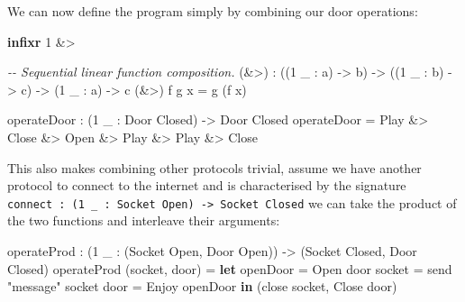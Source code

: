\documentclass[
]{article}
\newenvironment{Shaded}{}{}
\newcommand{\CommentTok}[1]{\textcolor[rgb]{0.38,0.63,0.69}{\textit{#1}}}
\newcommand{\DataTypeTok}[1]{\textcolor[rgb]{0.56,0.13,0.00}{#1}}
\newcommand{\DecValTok}[1]{\textcolor[rgb]{0.25,0.63,0.44}{#1}}
\newcommand{\KeywordTok}[1]{\textcolor[rgb]{0.00,0.44,0.13}{\textbf{#1}}}
\newcommand{\NormalTok}[1]{#1}
\newcommand{\OperatorTok}[1]{\textcolor[rgb]{0.40,0.40,0.40}{#1}}
\newcommand{\OtherTok}[1]{\textcolor[rgb]{0.00,0.44,0.13}{#1}}
\newcommand{\StringTok}[1]{\textcolor[rgb]{0.25,0.44,0.63}{#1}}
\begin{document}
We can now define the program simply by combining our door operations:

\begin{Shaded}
\begin{Highlighting}[]
\KeywordTok{infixr} \DecValTok{1} \OperatorTok{\&\textgreater{}}

\CommentTok{{-}{-} Sequential linear function composition.}
\NormalTok{(}\OperatorTok{\&\textgreater{}}\NormalTok{) }\OperatorTok{:}\NormalTok{ ((}\DecValTok{1}\NormalTok{ \_ }\OperatorTok{:}\NormalTok{ a) }\OtherTok{{-}\textgreater{}}\NormalTok{ b) }\OtherTok{{-}\textgreater{}} 
\NormalTok{       ((}\DecValTok{1}\NormalTok{ \_ }\OperatorTok{:}\NormalTok{ b) }\OtherTok{{-}\textgreater{}}\NormalTok{ c) }\OtherTok{{-}\textgreater{}} 
\NormalTok{        (}\DecValTok{1}\NormalTok{ \_ }\OperatorTok{:}\NormalTok{ a) }\OtherTok{{-}\textgreater{}}\NormalTok{ c}
\NormalTok{(}\OperatorTok{\&\textgreater{}}\NormalTok{) f g x }\OtherTok{=}\NormalTok{ g (f x)}

\NormalTok{operateDoor }\OperatorTok{:}\NormalTok{ (}\DecValTok{1}\NormalTok{ \_ }\OperatorTok{:} \DataTypeTok{Door} \DataTypeTok{Closed}\NormalTok{) }\OtherTok{{-}\textgreater{}} \DataTypeTok{Door} \DataTypeTok{Closed}
\NormalTok{operateDoor }\OtherTok{=} \DataTypeTok{Play} \OperatorTok{\&\textgreater{}} \DataTypeTok{Close} \OperatorTok{\&\textgreater{}} \DataTypeTok{Open} \OperatorTok{\&\textgreater{}} \DataTypeTok{Play} \OperatorTok{\&\textgreater{}} \DataTypeTok{Play} \OperatorTok{\&\textgreater{}} \DataTypeTok{Close}
\end{Highlighting}
\end{Shaded}

This also makes combining other protocols trivial, assume we have
another protocol to connect to the internet and is characterised by the
signature
\texttt{connect\ :\ (1\ \_\ :\ Socket\ Open)\ -\textgreater{}\ Socket\ Closed}
we can take the product of the two functions and interleave their
arguments:

\begin{Shaded}
\begin{Highlighting}[]
\NormalTok{operateProd }\OperatorTok{:}\NormalTok{ (}\DecValTok{1}\NormalTok{ \_ }\OperatorTok{:}\NormalTok{ (}\DataTypeTok{Socket} \DataTypeTok{Open}\NormalTok{, }\DataTypeTok{Door} \DataTypeTok{Open}\NormalTok{)) }
           \OtherTok{{-}\textgreater{}}\NormalTok{ (}\DataTypeTok{Socket} \DataTypeTok{Closed}\NormalTok{, }\DataTypeTok{Door} \DataTypeTok{Closed}\NormalTok{)}
\NormalTok{operateProd (socket, door) }\OtherTok{=} 
  \KeywordTok{let}\NormalTok{ openDoor }\OtherTok{=} \DataTypeTok{Open}\NormalTok{ door}
\NormalTok{      socket\textquotesingle{} }\OtherTok{=}\NormalTok{ send }\StringTok{"message"}\NormalTok{ socket}
\NormalTok{      door\textquotesingle{} }\OtherTok{=} \DataTypeTok{Enjoy}\NormalTok{ openDoor }\KeywordTok{in}
\NormalTok{      (close socket\textquotesingle{}, }\DataTypeTok{Close}\NormalTok{ door\textquotesingle{})}
\end{Highlighting}
\end{Shaded}
\end{document}
